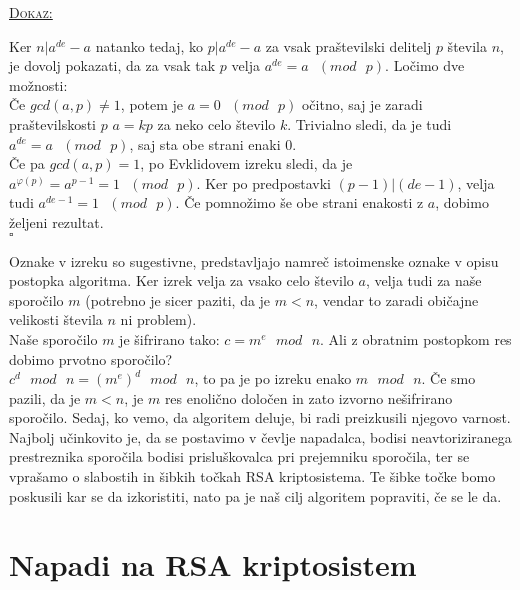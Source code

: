 \documentclass[a4paper, 12pt]{article} %
\newenvironment{matematika}[1]{
\textcolor{bostonuniversityred}{\underline{\textsc{#1:}}}
}{
}
\begin{document}
\begin{matematika}{Dokaz}
Ker $n | a^{de} - a$ natanko tedaj, ko $p | a^{de} - a$ za vsak praštevilski delitelj $p$ števila $n$, je dovolj pokazati, da za vsak tak $p$ velja $a^{de} = a \text{ } (mod \text{ } p)$. Ločimo dve možnosti: \\
Če $gcd(a, p) \neq 1$, potem je $a = 0 \text{ } (mod \text{ } p)$ očitno, saj je zaradi praštevilskosti $p$ $a = kp$ za neko celo število $k$. Trivialno sledi, da je tudi $a^{de} = a \text{ } (mod \text{ } p)$, saj sta obe strani enaki $0$. \\
Če pa $gcd(a, p) = 1$, po Evklidovem izreku sledi, da je $a^{\varphi (p)} = a^{p-1} = 1 \text{ } (mod \text{ } p)$. Ker po predpostavki $(p-1)|(de-1)$, velja tudi $a^{de-1} = 1 \text{ } (mod \text{ } p)$. Če pomnožimo še obe strani enakosti z $a$, dobimo željeni rezultat. \\ \hspace*{\fill} $\square$ \\
\end{matematika}

Oznake v izreku so sugestivne, predstavljajo namreč istoimenske oznake v opisu postopka algoritma. Ker izrek velja za vsako celo število $a$, velja tudi za naše sporočilo $m$ (potrebno je sicer paziti, da je $m < n$, vendar to zaradi običajne velikosti števila $n$ ni problem). \\
Naše sporočilo $m$ je šifrirano tako: $c = m^e \text{ } mod \text{ } n$. Ali z obratnim postopkom res dobimo prvotno sporočilo? \\
$c^d \text{ } mod \text{ } n = (m^{e})^{d} \text{ } mod \text{ } n$, to pa je po izreku enako $m \text{ } mod \text{ } n$. Če smo pazili, da je $m < n$, je $m$ res enolično določen in zato izvorno nešifrirano sporočilo.
\newline
\newline
Sedaj, ko vemo, da algoritem deluje, bi radi preizkusili njegovo varnost. Najbolj učinkovito je, da se postavimo v čevlje napadalca, bodisi neavtoriziranega prestreznika sporočila bodisi prisluškovalca pri prejemniku sporočila, ter se vprašamo o slabostih in šibkih točkah RSA kriptosistema. Te šibke točke bomo poskusili kar se da izkoristiti, nato pa je naš cilj algoritem popraviti, če se le da.

\newpage

\section{Napadi na RSA kriptosistem}
\end{document}

